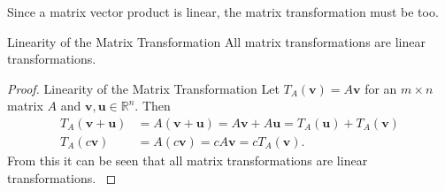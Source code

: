  \noindent Since a matrix vector product is linear, the matrix transformation must be too. 
\begin{theorem}{Linearity of the Matrix Transformation}
    \label{the:linearityMatrixTransformation}
    All matrix transformations are linear transformations.\cite[170]{LiAl}
\end{theorem}
\begin{proof}{Linearity of the Matrix Transformation}
     Let $T_A(\textbf{v})=A\textbf{v}$ for an $m\times n$ matrix $A$ and $\textbf{v}, \textbf{u} \in \mathbb{R}^n$. Then
     \begin{align*}
         T_A(\textbf{v}+\textbf{u})&=A(\textbf{v}+\textbf{u})=A\textbf{v}+A\textbf{u}=T_A(\textbf{u})+T_A(\textbf{v})\\
         T_A(c\textbf{v})&=A(c\textbf{v})=cA\textbf{v}=cT_A(\textbf{v}).
     \end{align*}
     From this it can be seen that all matrix transformations are linear transformations. \cite[170]{LiAl}\qedsymbol
\end{proof}

